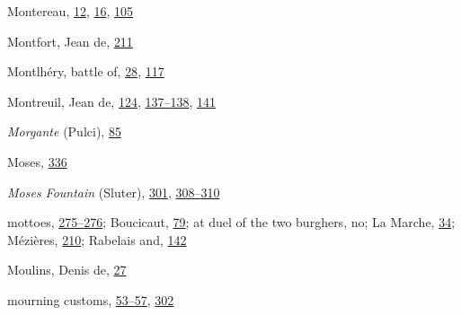 Montereau,
\protect\hyperlink{08_Chapter_One__THE_PASSIONATE_INTE.xhtmlux5cux23page_12}{12},
\protect\hyperlink{08_Chapter_One__THE_PASSIONATE_INTE.xhtmlux5cux23page_16}{16},
\protect\hyperlink{10_Chapter_Three__THE_HEROIC_DREAM.xhtmlux5cux23page_105}{105}

Montfort, Jean de,
\protect\hyperlink{14_Chapter_Seven__THE_PIOUS_PERSONA.xhtmlux5cux23page_211}{211}

Montlhéry, battle of,
\protect\hyperlink{08_Chapter_One__THE_PASSIONATE_INTE.xhtmlux5cux23page_28}{28},
\protect\hyperlink{10_Chapter_Three__THE_HEROIC_DREAM.xhtmlux5cux23page_117}{117}

Montreuil, Jean de,
\protect\hyperlink{10_Chapter_Three__THE_HEROIC_DREAM.xhtmlux5cux23page_124}{124},
\protect\hyperlink{11_Chapter_Four__THE_FORMS_OF_LOVE.xhtmlux5cux23page_137}{137--}\protect\hyperlink{11_Chapter_Four__THE_FORMS_OF_LOVE.xhtmlux5cux23page_138}{138},
\protect\hyperlink{11_Chapter_Four__THE_FORMS_OF_LOVE.xhtmlux5cux23page_141}{141}

\emph{Morgante} (Pulci),
\protect\hyperlink{10_Chapter_Three__THE_HEROIC_DREAM.xhtmlux5cux23page_85}{85}

Moses,
\protect\hyperlink{21_Chapter_Thirteen__IMAGE_AND_WORD.xhtmlux5cux23page_336}{336}

\emph{Moses Fountain} (Sluter),
\protect\hyperlink{20_ILLUSTRATIONS_FOLLOW_PAGE.xhtmlux5cux23page_301}{301},
\protect\hyperlink{20_ILLUSTRATIONS_FOLLOW_PAGE.xhtmlux5cux23page_308}{308--}\protect\hyperlink{20_ILLUSTRATIONS_FOLLOW_PAGE.xhtmlux5cux23page_310}{310}

mottoes,
\protect\hyperlink{18_Chapter_Eleven__THE_FORMS_OF_THO.xhtmlux5cux23page_275}{275--}\protect\hyperlink{18_Chapter_Eleven__THE_FORMS_OF_THO.xhtmlux5cux23page_276}{276};
Boucicaut,
\protect\hyperlink{10_Chapter_Three__THE_HEROIC_DREAM.xhtmlux5cux23page_79}{79};
at duel of the two burghers, no; La Marche,
\protect\hyperlink{09_Chapter_Two__THE_CRAVING_FOR_A_M.xhtmlux5cux23page_34}{34};
Mézières,
\protect\hyperlink{14_Chapter_Seven__THE_PIOUS_PERSONA.xhtmlux5cux23page_210}{210};
Rabelais and,
\protect\hyperlink{11_Chapter_Four__THE_FORMS_OF_LOVE.xhtmlux5cux23page_142}{142}

Moulins, Denis de,
\protect\hyperlink{08_Chapter_One__THE_PASSIONATE_INTE.xhtmlux5cux23page_27}{27}

mourning customs,
\protect\hyperlink{09_Chapter_Two__THE_CRAVING_FOR_A_M.xhtmlux5cux23page_53}{53--}\protect\hyperlink{09_Chapter_Two__THE_CRAVING_FOR_A_M.xhtmlux5cux23page_57}{57},
\protect\hyperlink{20_ILLUSTRATIONS_FOLLOW_PAGE.xhtmlux5cux23page_302}{302}

